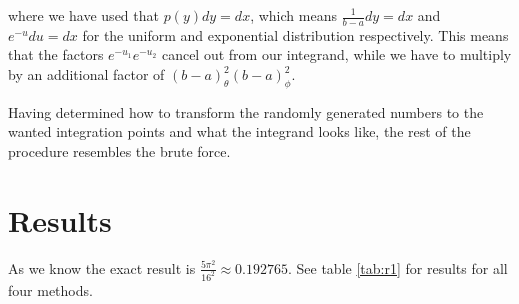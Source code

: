 \documentclass[norsk,a4paper,11pt]{article}
\begin{document}
where we have used that $p(y)dy = dx$, which means $\frac{1}{b-a} dy = dx$ and $e^{-u}du = dx$ for the uniform and exponential
distribution respectively. This means that the factors $e^{-u_1}e^{-u_2}$ cancel out from our integrand, while we have to multiply by
an additional factor of $(b-a)_\theta^2 (b-a)_\phi^2$.

Having determined how to transform the randomly generated numbers to the wanted integration points and what the integrand looks like, the
rest of the procedure resembles the brute force.

\section{Results}
As we know the exact result is $\frac{5\pi^2}{16^2}\approx 0.192765$. 
See table \ref{tab:r1} for results for all four methods.
\end{document}

